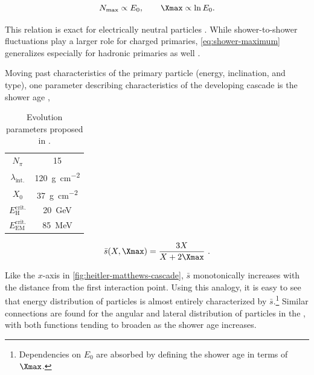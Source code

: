 \begin{table}[h!]
\begin{minipage}[t]{0.70\linewidth}

\begin{equation}
\label{eq:shower-maximum}
N_\mathrm{max} \propto E_0, \qquad\Xmax \propto \ln{E_0}.
\end{equation}

This relation is exact for electrically neutral particles 
\cite{HeitlerQuantumTheory}. While shower-to-shower fluctuations play a larger 
role for charged primaries, \cref{eq:shower-maximum} generalizes especially for
hadronic primaries as well \cite{gaisserCosmicRaysParticle2016,
matthewsHeitlerModelExtensive2005}.

Moving past characteristics of the primary particle (energy, inclination, and 
type), one parameter describing characteristics of the developing cascade is 
the shower age \cite{rossiCosmicRayTheory1941}, 

\end{minipage}\hfill
\begin{minipage}[t]{0.25\linewidth}
\vspace{-0.1cm}
\caption{Evolution parameters proposed in 
\cite{matthewsHeitlerModelExtensive2005}.}
\label{tab:shower-parameters}
\begin{tabularx}{\textwidth}{cc}
\toprule
$N_\pi$ 		       & 15 \\
$\lambda_\mathrm{int.}$        & \SI{120}{\gram\per\centi\meter\squared} \\
$X_0$ 			       & \SI{37}{\gram\per\centi\meter\squared} \\
$E^\mathrm{crit.}_\mathrm{H}$  & \SI{20}{\giga\eV} \\
$E^\mathrm{crit.}_\mathrm{EM}$ & \SI{85}{\mega\eV} \\
\bottomrule
\end{tabularx}

\end{minipage}%
\end{table}

\begin{equation}
\label{eq:shower-age}
\bar{s}(X, \Xmax) = \frac{3X}{X + 2\Xmax}\ .
\end{equation}

Like the $x$-axis in \cref{fig:heitler-matthews-cascade}, $\bar{s}$ 
monotonically increases with the distance from the first interaction point.
Using this analogy, it is easy to see that energy distribution of particles is
almost entirely characterized by $\bar{s}$.\footnote{Dependencies on $E_0$ are
absorbed by defining the shower age in terms of $\Xmax$.} Similar connections 
are found for the angular and lateral distribution of particles in the \EAS
\cite{rossiCosmicRayTheory1941}, with both functions tending to broaden as the 
shower age increases.

